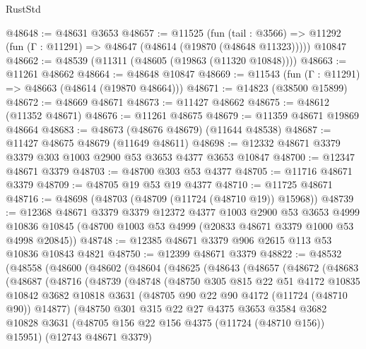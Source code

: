 \begin{lexlean}{RustStd}
\begin{coremodule}
@48648 := @48631 @3653
@48657 := @11525
    (fun (tail : @3566) => @11292 (fun (Γ : @11291) => @48647 (@48614 (@19870 (@48648 @11323)))))
    @10847
@48662 := @48539 (@11311 (@48605 (@19863 (@11320 @10848))))
@48663 := @11261 @48662
@48664 := @48648 @10847
@48669 := @11543 (fun (Γ : @11291) => @48663 (@48614 (@19870 @48664)))
@48671 := @14823 (@38500 @15899)
@48672 := @48669 @48671
@48673 := @11427 @48662
@48675 := @48612 (@11352 @48671)
@48676 := @11261 @48675
@48679 := @11359 @48671 @19869 @48664
@48683 := @48673 (@48676 @48679) (@11644 @48538)
@48687 := @11427 @48675 @48679 (@11649 @48611)
@48698 := @12332 @48671 @3379 @3379 @303 @1003 @2900 @53 @3653 @4377 @3653 @10847
@48700 := @12347 @48671 @3379
@48703 := @48700 @303 @53 @4377
@48705 := @11716 @48671 @3379
@48709 := @48705 @19 @53 @19 @4377
@48710 := @11725 @48671
@48716 := @48698 (@48703 (@48709 (@11724 (@48710 @19)) @15968))
@48739 := @12368
    @48671
    @3379
    @3379
    @12372
    @4377
    @1003
    @2900
    @53
    @3653
    @4999
    @10836
    @10845
    (@48700 @1003 @53 @4999 (@20833 @48671 @3379 @1000 @53 @4998 @20845))
@48748 := @12385 @48671 @3379 @906 @2615 @113 @53 @10836 @10843 @4821
@48750 := @12399 @48671 @3379
@48822 := @48532
    (@48558
      (@48600
        (@48602
          (@48604
            (@48625
              (@48643
                (@48657
                  (@48672
                    (@48683
                      (@48687
                        (@48716
                          (@48739
                            (@48748
                              (@48750
                                @305
                                @815
                                @22
                                @51
                                @4172
                                @10835
                                @10842
                                @3682
                                @10818
                                @3631
                                (@48705 @90 @22 @90 @4172 (@11724 (@48710 @90)) @14877)
                                (@48750
                                  @301
                                  @315
                                  @22
                                  @27
                                  @4375
                                  @3653
                                  @3584
                                  @3682
                                  @10828
                                  @3631
                                  (@48705 @156 @22 @156 @4375 (@11724 (@48710 @156)) @15951)
                                  (@12743 @48671 @3379)

\end{coremodule}
\end{lexlean}
